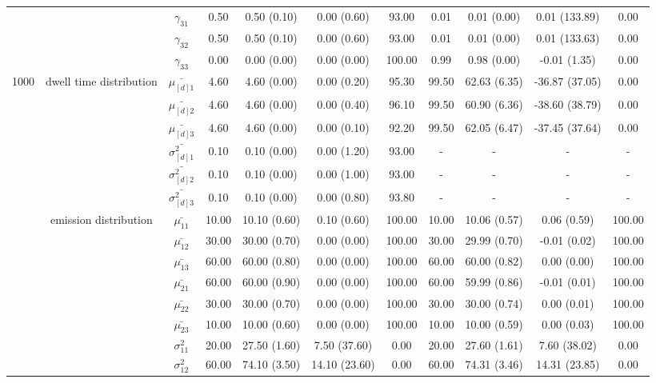 \begin{table}[h]
{\begin{tabular}{ccccccccccc}
 &  & $\gamma_{31}$ & 0.50 & 0.50 (0.10) & 0.00 (0.60) & 93.00 & 0.01 & 0.01 (0.00) & 0.01 (133.89) & 0.00 \\
 &  & $\gamma_{32}$ & 0.50 & 0.50 (0.10) & 0.00 (0.60) & 93.00 & 0.01 & 0.01 (0.00) & 0.01 (133.63) & 0.00 \\
 &  & $\gamma_{33}$ & 0.00 & 0.00 (0.00) & 0.00 (0.00) & 100.00 & 0.99 & 0.98 (0.00) & -0.01 (1.35) & 0.00 \\ \midrule
1000 & dwell time distribution & $\bar{\mu_{[d]1}}$ & 4.60 & 4.60 (0.00) & 0.00 (0.20) & 95.30 & 99.50 & 62.63 (6.35) & -36.87 (37.05) & 0.00 \\
\multirow{26}{*}{} & \multirow{5}{*}{} & $\bar{\mu_{[d]2}}$ & 4.60 & 4.60 (0.00) & 0.00 (0.40) & 96.10 & 99.50 & 60.90 (6.36) & -38.60 (38.79) & 0.00 \\
 &  & $\bar{\mu_{[d]3}}$ & 4.60 & 4.60 (0.00) & 0.00 (0.10) & 92.20 & 99.50 & 62.05 (6.47) & -37.45 (37.64) & 0.00 \\
 &  & $\bar{\sigma^2_{[d]1}}$ & 0.10 & 0.10 (0.00) & 0.00 (1.20) & 93.00 & - & - & - & - \\
 &  & $\bar{\sigma^2_{[d]2}}$ & 0.10 & 0.10 (0.00) & 0.00 (1.00) & 93.00 & - & - & - & - \\
 &  & $\bar{\sigma^2_{[d]3}}$ & 0.10 & 0.10 (0.00) & 0.00 (0.80) & 93.80 & - & - & - & - \\
 & emission distribution & $\bar{\mu_{11}}$ & 10.00 & 10.10 (0.60) & 0.10 (0.60) & 100.00 & 10.00 & 10.06 (0.57) & 0.06 (0.59) & 100.00 \\
 & \multirow{11}{*}{} & $\bar{\mu_{12}}$ & 30.00 & 30.00 (0.70) & 0.00 (0.00) & 100.00 & 30.00 & 29.99 (0.70) & -0.01 (0.02) & 100.00 \\
 &  & $\bar{\mu_{13}}$ & 60.00 & 60.00 (0.80) & 0.00 (0.00) & 100.00 & 60.00 & 60.00 (0.82) & 0.00 (0.00) & 100.00 \\
 &  & $\bar{\mu_{21}}$ & 60.00 & 60.00 (0.90) & 0.00 (0.00) & 100.00 & 60.00 & 59.99 (0.86) & -0.01 (0.01) & 100.00 \\
 &  & $\bar{\mu_{22}}$ & 30.00 & 30.00 (0.70) & 0.00 (0.00) & 100.00 & 30.00 & 30.00 (0.74) & 0.00 (0.01) & 100.00 \\
 &  & $\bar{\mu_{23}}$ & 10.00 & 10.00 (0.60) & 0.00 (0.00) & 100.00 & 10.00 & 10.00 (0.59) & 0.00 (0.03) & 100.00 \\
 &  & $\sigma^2_{11}$ & 20.00 & 27.50 (1.60) & 7.50 (37.60) & 0.00 & 20.00 & 27.60 (1.61) & 7.60 (38.02) & 0.00 \\
 &  & $\sigma^2_{12}$ & 60.00 & 74.10 (3.50) & 14.10 (23.60) & 0.00 & 60.00 & 74.31 (3.46) & 14.31 (23.85) & 0.00 \\

\end{tabular}}
\end{table}
